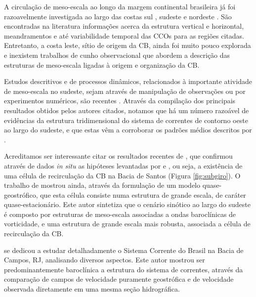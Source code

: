 \hspace{6mm} A circulação de meso-escala ao longo da margem continental brasileira já foi razoavelmente
investigada ao largo das costas sul \citep{olson_etal1988}, sudeste \citep{silveira_etal2000A} e nordeste 
\citep{silveira_etal2000B}. São encontradas
na literatura informações acerca da estrutura vertical e horizontal, 
meandramentos e até variabilidade temporal das CCOs para as regiões citadas.
Entretanto, a costa leste, sítio de origem da CB, ainda foi muito pouco
explorada e inexistem trabalhos de cunho observacional que abordem a descrição das estruturas de
 meso-escala ligadas à origem e organização da CB.  

Estudos descritivos e de processos dinâmicos, relacionados à importante
atividade de meso-escala no sudeste, sejam através de manipulação de observações ou por
experimentos numéricos, são recentes \citep{schmid_etal1995,lima1997,velhote1998,campos_etal2000,calado2001,fernandes2001,silveira_etal2004,godoi2005,
calado2006,mattos2006,silveira2006}. Através da compilação dos principais resultados obtidos pelos 
autores citados, notamos que há um número razoável de evidências da estrutura
tridimensional do sistema de correntes de contorno oeste ao largo do sudeste,
e que estas vêm a corroborar os padrões médios descritos por \cite{stramma_england1999}.

Acreditamos ser interessante citar os resultados recentes de \cite{mattos2006},
que confirmou através de dados {\it in situ} as hipóteses levantadas por \cite{tsuchiya1985} 
e \cite{vianna_menezes2005}, ou seja, a existência de uma célula de recirculação 
da CB na Bacia de Santos (Figura \ref{fig:subgiro}). O trabalho de \cite{mattos2006} mostrou ainda, através
da formulação de um modelo quase-geostrófico, que esta célula consiste numa estrutura de
grande escala, de caráter quase-estacionário. Este autor sintetiza que o cenário sinótico 
ao largo do sudeste é composto por estruturas de meso-escala associadas a ondas baroclínicas 
de vorticidade, e uma estrutura de grande escala mais robusta, associada a célula de recirculação da CB.

\cite{silveira2006} se dedicou a estudar detalhadamente o Sistema 
Corrente do Brasil na Bacia de Campos, RJ, analisando diversos aspectos.
Este autor mostrou ser predominantemente baroclínica a estrutura do sistema
de correntes, através da comparação de campos de velocidade puramente geostrófica
e de velocidade observada diretamente em uma mesma seção hidrográfica. 

